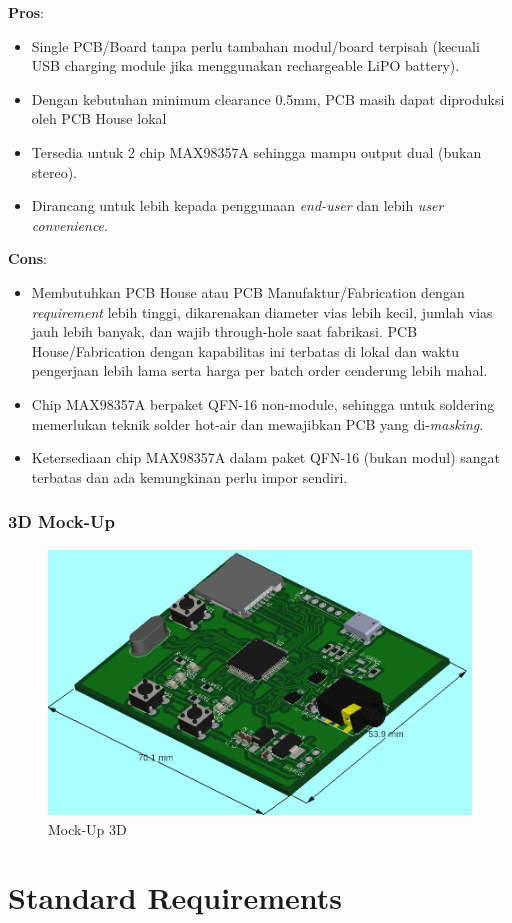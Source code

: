\documentclass[12pt,]{article}
\begin{document}
	\textbf{Pros}:
	\begin{itemize}
		\item Single PCB/Board tanpa perlu tambahan modul/board terpisah
		(kecuali USB charging module jika menggunakan rechargeable LiPO battery).
		
		\item Dengan kebutuhan minimum clearance 0.5mm, PCB masih dapat diproduksi oleh PCB House lokal
		
		\item Tersedia untuk 2 chip MAX98357A sehingga mampu output dual (bukan stereo).
		
		\item Dirancang untuk lebih kepada penggunaan \textit{end-user} dan lebih \textit{user convenience}.
	\end{itemize}
	
	\textbf{Cons}:
	\begin{itemize}
		\item Membutuhkan PCB House atau PCB Manufaktur/Fabrication dengan \textit{requirement} lebih tinggi,
		dikarenakan diameter vias lebih kecil, jumlah vias jauh lebih banyak, dan wajib through-hole saat fabrikasi.
		PCB House/Fabrication dengan kapabilitas ini terbatas di lokal dan waktu pengerjaan lebih lama serta harga per batch order cenderung lebih mahal. 
		
		\item Chip MAX98357A berpaket QFN-16 non-module, sehingga untuk soldering memerlukan teknik solder hot-air dan mewajibkan PCB yang di-\textit{masking}.
	
		\item Ketersediaan chip MAX98357A dalam paket QFN-16 (bukan modul) sangat terbatas dan ada kemungkinan perlu impor sendiri.
	\end{itemize}

	\subsubsection{3D Mock-Up}
	\begin{figure}[!ht]
		\centering
		\includegraphics[width=400pt]{images/test3}
		\caption{Mock-Up 3D}
	\end{figure}
	
	
	\newpage
	\section{Standard Requirements} 
	
	
\end{document}

